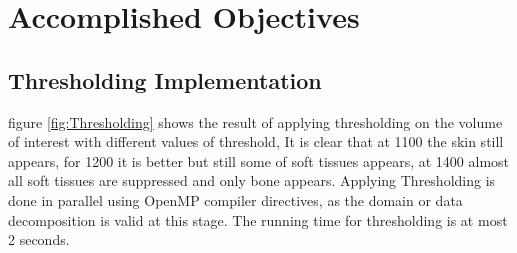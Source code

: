 \documentclass[10pt, b5paper]{article}
\begin{document}
\section{Accomplished Objectives}
\subsection{Thresholding Implementation}
figure \ref{fig:Thresholding} shows the result of applying thresholding on the volume of interest with different values of threshold, It is clear that at 1100 the skin still appears, for 1200 it is better but still some of soft tissues appears, at 1400 almost all soft tissues are suppressed and only bone appears. Applying Thresholding is done in parallel using OpenMP compiler directives, as the domain or data decomposition is valid at this stage. The running time for thresholding is at most 2 seconds.
\end{document}
